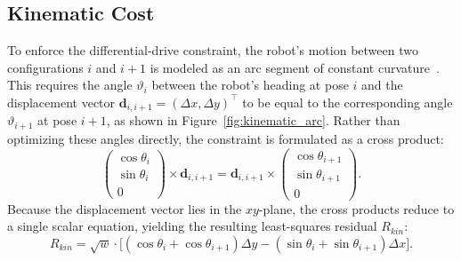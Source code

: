 \subsection{Kinematic Cost}
\label{subsec:kinematic-cost}
To enforce the differential-drive constraint, the robot's motion between two configurations $i$ and $i+1$ is modeled as an arc segment of constant curvature~\cite{rosmann2012teb}. This requires the angle $\vartheta_{i}$ between the robot's heading at pose $i$ and the displacement vector $\mathbf{d}_{i,i+1} = (\Delta x, \Delta y)^\top$ to be equal to the corresponding angle $\vartheta_{i+1}$ at pose $i+1$, as shown in Figure~\ref{fig:kinematic_arc}. Rather than optimizing these angles directly, the constraint is formulated as a cross product:
\begin{equation}
    \begin{pmatrix} \cos \theta_i \\ \sin \theta_i \\ 0 \end{pmatrix} \times \mathbf{d}_{i,i+1} = \mathbf{d}_{i,i+1} \times \begin{pmatrix} \cos \theta_{i+1} \\ \sin \theta_{i+1} \\ 0 \end{pmatrix}.
\end{equation}
Because the displacement vector lies in the $xy$-plane, the cross products reduce to a single scalar equation, yielding the resulting least-squares residual $R_{kin}$:
\begin{equation}
    R_{kin} = \sqrt{w} \cdot \Big[ (\cos\theta_i + \cos\theta_{i+1})\Delta y - (\sin\theta_i + \sin\theta_{i+1})\Delta x \Big].
\end{equation}


